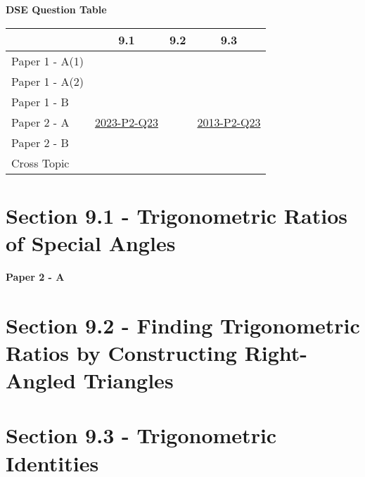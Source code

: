 \documentclass[12pt, a4paper]{article}
\begin{document}
\begin{absolutelynopagebreak}
\begin{center}
\textbf{DSE Question Table}
\end{center}
\begin{center}
\begin{tabular}{|l|c|c|c|}
\hline
        & 9.1 & 9.2 & 9.3 \\\hline
\hline
Paper 1 - A(1)&  &  &  \\
\hline
Paper 1 - A(2)&  &  &  \\
\hline
Paper 1 - B&  &  &  \\
\hline
\hline
Paper 2 - A& \hyperref[DSE2023-CoreP2-Q23]{2023-P2-Q23} &  & \hyperref[DSE2013-CoreP2-Q23]{2013-P2-Q23} \\
\hline
Paper 2 - B&  &  &  \\
\hline
\hline
Cross Topic&  &  &  \\
\hline
\end{tabular}
\end{center}
\end{absolutelynopagebreak}




\section*{Section 9.1 - Trigonometric Ratios of Special Angles}\label{section:3-9-1}

\textbf{Paper 2 - A}
\begin{enumx}[label=\arabic*.,start=1]
\item {}\label{DSE2023-CoreP2-Q23} 
\end{enumx}




\section*{Section 9.2 - Finding Trigonometric Ratios by Constructing Right-Angled Triangles}\label{section:3-9-2}





\section*{Section 9.3 - Trigonometric Identities}\label{section:3-9-3}
\end{document}
